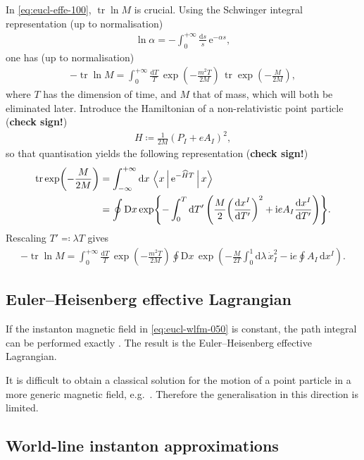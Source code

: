 \documentclass[12pt]{article}
\newcommand\mi{\mathrm{i}} %
\newcommand\me{\mathrm{e}} %
\newcommand\dif{\mathrm{d}}
\newcommand\Dif{\mathrm{D}}
\DeclareMathOperator{\tr}{tr}
\newcommand{\rbr}[1]{{\left(#1\right)}}
\newcommand{\rfun}[2]{{#1}\mathopen{}\left(#2\right)\mathclose{}}
\newcommand{\cfun}[2]{{#1}\mathopen{}\left\{#2\right\}\mathclose{}}
\newcommand{\frde}[2]{{\frac{\dif{#1}}{\dif{#2}}}}
\begin{document}
In \cref{eq:eucl-effe-100}, $\tr\ln M$ is crucial. Using the Schwinger 
integral representation \cite{Schwinger1951} (up to normalisation)
\begin{align}
\ln \alpha = -\int_0^{+\infty} \frac{\dif s}{s}\,\me^{-\alpha s},
\end{align}
one has (up to normalisation)
\begin{align}
- \tr\ln M = \int_0^{+\infty} \frac{\dif T}{T}\,
	\rfun{\exp}{-\frac{m^2 T}{2M}}\,
	\tr \rfun{\exp}{-\frac{M}{2M}},
\end{align}
where $T$ has the dimension of time, and $M$ that of mass, which will both be 
eliminated later. Introduce the Hamiltonian of a non-relativistic point 
particle (\textbf{check sign!})
\begin{align}
H \coloneqq \frac{1}{2M} \rbr{P_I + e A_I}^2,
\end{align}
so that quantisation yields the following representation (\textbf{check sign!})
\begin{align}
\tr \rfun{\exp}{-\frac{M}{2M}} &= \int_{-\infty}^{+\infty}\dif x\,
\Braket{x | \me^{-\widehat{H} T} | x}
\\
&= \oint \Dif x\,\cfun{\exp}{-\int_{0}^{T}\dif T'\,
	\rbr{\frac{M}{2} \rbr{\frde{x^I}{T'}}^2 + \mi e A_I \frde{x^I}{T'}}}.
\label{eq:eucl-wlfm-050}
\end{align}
Rescaling $T' \eqqcolon \lambda T$ gives
\begin{align}
- \tr\ln M = \int_{0}^{+\infty} \frac{\dif T}{T}\,
	\rfun{\exp}{-\frac{m^2 T}{2M}}
	\oint \Dif x\,
		\rfun{\exp}{-\frac{M}{2T} \int_{0}^{1} \dif \lambda\, \dot{x}_I^2
			- \mi e \oint A_I\,\dif x^I}.
\label{eq:eucl-wlfm-100}
\end{align}

\subsection{Euler--Heisenberg effective Lagrangian}
\label{ssec:eucl-ehel}

If the instanton magnetic field in \cref{eq:eucl-wlfm-050} is constant, the 
path integral can be performed exactly \cite{Feynman1965}. The result is the 
Euler--Heisenberg effective Lagrangian.

It is difficult to obtain a classical solution for the motion of a point 
particle in a more generic magnetic field, e.g.\ \cite{Kondo1964}. Therefore 
the generalisation in this direction is limited.

\subsection{World-line instanton approximations}
\label{ssec:eucl-wlia}
\end{document}
